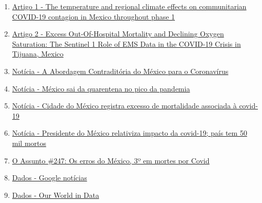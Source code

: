 \documentclass{article}
\begin{document}
\begin{enumerate}
    \item \href{https://www.sciencedirect.com/science/article/pii/S0048969720330771}{Artigo 1 - The temperature and regional climate effects on communitarian COVID-19 contagion in Mexico throughout phase 1}
    \item \href{https://www.sciencedirect.com/science/article/pii/S0196064420306016}{Artigo 2 - Excess Out-Of-Hospital Mortality and Declining Oxygen Saturation: The Sentinel 1 Role of EMS Data in the COVID-19 Crisis in Tijuana, Mexico}
    \item \href{https://www.nexojornal.com.br/expresso/2020/03/26/A-abordagem-contradit\%C3\%B3ria-do-M\%C3\%A9xico-para-o-coronav\%C3\%ADrus}{Notícia - A Abordagem Contraditória do México para o Coronavírus}
    \item \href{https://g1.globo.com/mundo/blog/sandra-cohen/post/2020/06/05/mexico-sai-da-quarentena-no-pico-da-pandemia.ghtml}{Notícia - México sai da quarentena no pico da pandemia}
    \item \href{https://noticias.uol.com.br/ultimas-noticias/afp/2020/09/17/cidade-do-mexico-registra-excesso-de-mortalidade-associada-a-covid-19.htm}{Notícia - Cidade do México registra excesso de mortalidade associada à covid-19}
    \item \href{https://noticias.uol.com.br/ultimas-noticias/afp/2020/08/07/lopez-obrador-relativiza-impacto-da-covid-19-no-mexico.htm}{Notícia - Presidente do México relativiza impacto da covid-19; país tem 50 mil mortos}
    \item \href{https://g1.globo.com/podcast/o-assunto/noticia/2020/08/06/o-assunto-247-os-erros-do-mexico-3o-em-mortes-por-covid.ghtml}{O Assunto \#247: Os erros do México, 3º em mortes por Covid}
    \item \href{https://news.google.com/covid19/map?hl=pt-PT&mid=\%2Fm\%2F0b90_r&gl=PT&ceid=PT\%3Apt-150}{Dados - Google notícias}
    \item \href{https://ourworldindata.org/coronavirus}{Dados - Our World in Data}
\end{enumerate}
\end{document}
